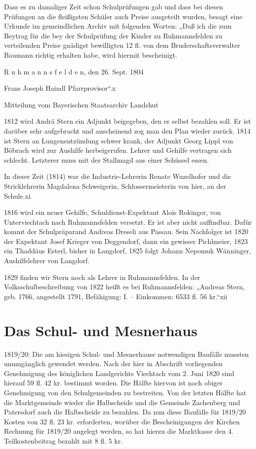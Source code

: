 \documentclass[12pt,a4paper]{book}
\begin{document}
Dass es zu damaliger Zeit schon Schulprüfungen gab und dass bei diesen Prüfungen
an die fleißigsten Schüler auch Preise ausgeteilt wurden, besagt eine Urkunde im
gemeindlichen Archiv mit folgenden Worten: „Daß ich die zum Beytrag für die bey
der Schulprüfung der Kinder zu Ruhmannsfelden zu verteilenden Preise gnädigst
bewilligten 12 fl. von dem Bruderschaftsverwalter Baumann richtig erhalten habe,
wird hiermit bescheinigt.

 R u h m a n n s f e l d e n, den 26. Sept. 1804

    Frans Joseph Haindl Pfarrprovisor“.x

Mitteilung vom Bayerischen Staatsarchiv Landshut

1812 wird Andrä Stern ein Adjunkt beigegeben, den er selbst bezahlen soll. Er
ist darüber sehr aufgebracht und anscheinend zog man den Plan wieder zurück.
1814 ist Stern an Lungenentzündung schwer krank, der Adjunkt Georg Lippl von
Böbrach wird zur Aushilfe herbeigerufen. Lehrer und Gehilfe vertragen sich
schlecht. Letzterer muss mit der Stallmagd aus einer Schüssel essen.

In dieser Zeit (1814) war die Industrie-Lehrerin Renate Wuzelhofer und die
Stricklehrerin Magdalena Schweigerin, Schlossermeisterin von hier, an der
Schule.xi

1816 wird ein neuer Gehilfe, Schuldienst-Expektant Alois Rokinger, von
Unterviechtach nach Ruhmannsfelden versetzt. Er ist aber nicht auffindbar. Dafür
kommt der Schulpräparand Andreas Dreseli aus Passau. Sein Nachfolger ist 1820
der Expektant Josef Krieger von Deggendorf, dann ein gewisser Pichlmeier, 1823
ein Thaddäus Esterl, bisher in Langdorf, 1825 folgt Johann Nepomuk Wänninger,
Aushilfslehrer von Langdorf.

1829 finden wir Stern noch als Lehrer in Ruhmannsfelden. In der
Volksschulbeschreibung von 1822 heißt es bei Ruhmannsfelden: „Andreas Stern,
geb. 1766, angestellt 1791, Befähigung: I. – Einkommen: 6533 fl. 56 kr.“xii

\section{Das Schul- und Mesnerhaus}

1819/20: Die am hiesigen Schul- und Mesnerhause notwendigen Baufälle mussten
unumgänglich gewendet werden. Nach der hier in Abschrift vorliegenden
Genehmigung des königlichen Landgerichts Viechtach vom 2. Juni 1820 sind hierauf
59 fl. 42 kr. bestimmt worden. Die Hälfte hiervon ist nach obiger Genehmigung
von den Schulgemeinden zu bestreiten. Von der letzten Hälfte hat die
Marktgemeinde wieder die Halbscheide und die Gemeinde Zachenberg und Patersdorf
auch die Halbscheide zu bezahlen. Da nun diese Baufälle für 1819/20 Kosten von
32 fl. 23 kr. erforderten, worüber die Bescheinigungen der Kirchen Rechnung für
1819/20 angelegt werden, so hat hierzu die Marktkasse den 4. Teilkostenbeitrag
bezahlt mit 8 fl. 5 kr.
\end{document}

